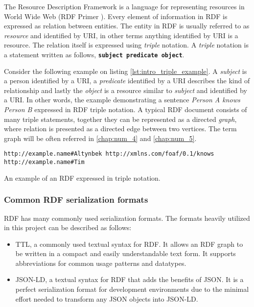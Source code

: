 The Resource Description Framework is a language for representing resources in World Wide Web (RDF Primer \cite{Miller:04:RP}). Every element of information in RDF is expressed as relation between entities. The entity in RDF is usually referred to as \textit{resource} and identified by \gls{URI}, in other terms anything identified by URI is a resource. The relation itself is expressed using \textit{triple} notation. A \textit{triple} notation is a statement written as follows, \texttt{\textbf{subject} \textbf{predicate} \textbf{object}}.

Consider the following example on listing \autoref{lst:intro_triple_example}. A \textit{subject} is a person identified by a URI, a \textit{predicate} identified by a URI describes the kind of relationship and lastly the \textit{object} is a resource similar to \textit{subject} and identified by a URI. In other words, the example demonstrating a sentence \textit{Person A knows Person B} expressed in RDF triple notation. A typical RDF document consists of many triple statements, together they can be represented as a directed \textit{graph}, where relation is presented as a directed edge between two vertices. The term graph will be often referred in \autoref{chap:num_4}  and \autoref{chap:num_5}.
 
\begin{listing}[ht]    
\begin{verbatim}
http://example.name#Altynbek http://xmlns.com/foaf/0.1/knows http://example.name#Tim
\end{verbatim}
\caption{An example of an RDF expressed in triple notation.} 
\label{lst:intro_triple_example}
\end{listing}

\subsubsection{Common RDF serialization formats}

RDF has many commonly used serialization formats. The formats heavily utilized in this project can be described as follows:
\begin{itemize}
	\item \gls{TTL}, a commonly used textual syntax for RDF. It allows an RDF graph to be written in a compact and easily understandable text form. It supports abbreviations for common usage patterns and datatypes.
	\item \gls{JSON-LD}, a textual syntax for RDF that adds the benefits of JSON. It is a perfect serialization format for development environments due to the minimal effort needed to transform any JSON objects into JSON-LD. 
\end{itemize}

